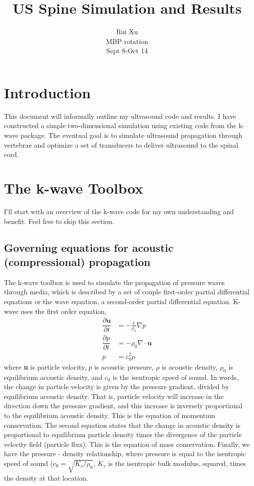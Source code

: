 \documentclass[10pt,a4paper]{article}
\title{US Spine Simulation and Results}
\author{Rui Xu \\ MBP rotation\\ Sept 8-Oct 14}
\begin{document}
\maketitle
 \newpage

\section*{Introduction}

This document will informally outline my ultrasound code and results. I have constructed a simple two-dimensional simulation using existing code from the k-wave package. The eventual goal is to simulate ultrasound propagation through vertebrae and optimize a set of transducers to deliver ultrasound to the spinal cord. 

\section*{The k-wave Toolbox}

I'll start with an overview of the k-wave code for my own understanding and benefit. Feel free to skip this section. 

\subsection*{Governing equations for acoustic (compressional) propagation}

The k-wave toolbox is used to simulate the propagation of pressure waves through media, which is described by a set of couple first-order partial differential equations or the wave equation, a second-order partial differential equation. K-wave uses the first order equation, 
\begin{align}
\dfrac{\partial \textbf{u}}{\partial t} &= - \frac{1}{\rho_0} \nabla p\\
\dfrac{\partial p }{\partial t} &= - \rho_0 \nabla \cdot \textbf{u}\\
p &= c_0^2 \rho
\end{align}
where \textbf{u} is particle velocity, $p$ is acoustic pressure, $\rho$ is acoustic density, $\rho_0$ is equilibrium acoustic density, and $c_0$ is the isentropic speed of sound. In words, the change in particle velocity is given by the pressure gradient, divided by equilibrium acoustic density. That is, particle velocity will increase in the direction down the pressure gradient, and this increase is inversely proportional to the equilibrium acoustic density. This is the equation of momentum conservation. The second equation states that the change in acoustic density is proportional to equilibrium particle density times the divergence of the particle velocity field (particle flux). This is the equation of mass conservation. Finally, we have the pressure - density relationship, where pressure is equal to the isentropic speed of sound ($c_0 = \sqrt{K_s/\rho_0}$, $K_s$ is the isentropic bulk modulus, squared, times the density at that location. 
\end{document}
